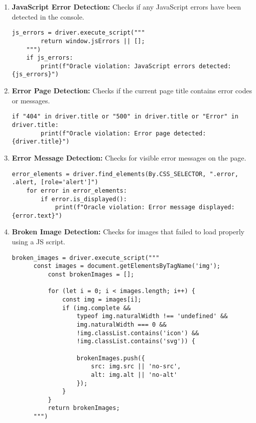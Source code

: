 \begin{enumerate}
    \item \textbf{JavaScript Error Detection:} Checks if any JavaScript errors have been detected in the console.
    \begin{lstlisting}[caption=JavaScript Error Oracle]
    js_errors = driver.execute_script("""
        return window.jsErrors || [];
    """)
    if js_errors:
        print(f"Oracle violation: JavaScript errors detected: {js_errors}")
    \end{lstlisting}

    \item \textbf{Error Page Detection:} Checks if the current page title contains error codes or messages.
    \begin{lstlisting}[caption=Error Page Oracle]
    if "404" in driver.title or "500" in driver.title or "Error" in driver.title:
        print(f"Oracle violation: Error page detected: {driver.title}")
    \end{lstlisting}

    \item \textbf{Error Message Detection:} Checks for visible error messages on the page.
    \begin{lstlisting}[caption=Error Message Oracle]
    error_elements = driver.find_elements(By.CSS_SELECTOR, ".error, .alert, [role='alert']")
    for error in error_elements:
        if error.is_displayed():
            print(f"Oracle violation: Error message displayed: {error.text}")
    \end{lstlisting}

    \item \textbf{Broken Image Detection:} Checks for images that failed to load properly using a JS script.
    \begin{lstlisting}[caption={Detecting broken images}]
      broken_images = driver.execute_script("""
      const images = document.getElementsByTagName('img');
          const brokenImages = [];
          
          for (let i = 0; i < images.length; i++) {
              const img = images[i];
              if (img.complete && 
                  typeof img.naturalWidth !== 'undefined' && 
                  img.naturalWidth === 0 &&
                  !img.classList.contains('icon') && 
                  !img.classList.contains('svg')) {
                  
                  brokenImages.push({
                      src: img.src || 'no-src',
                      alt: img.alt || 'no-alt'
                  });
              }
          }
          return brokenImages;
      """)
      

\end{lstlisting}
\end{enumerate}
